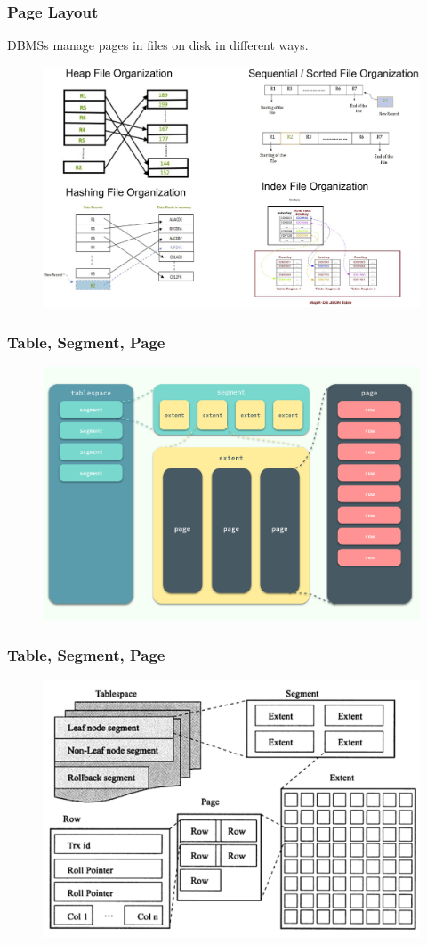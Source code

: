 \begin{frame}[fragile]
	\frametitle{Page Layout}
	DBMSs manage pages in files on disk in different ways.
	\begin{figure}
		\includegraphics[width=.7\linewidth]{figs/dbfile-layouts.pdf}
	\end{figure}
\end{frame}


\begin{frame}[fragile]
	\frametitle{Table, Segment, Page}
	\begin{figure}
		\includegraphics[width=.68\linewidth]{figs/dbfile-table-seg-page1.png}
	\end{figure}
\end{frame}

\begin{frame}[fragile]
	\frametitle{Table, Segment, Page}
	\begin{figure}
		\includegraphics[width=.68\linewidth]{figs/dbfile-table-seg-page2.png}
	\end{figure}
\end{frame}


